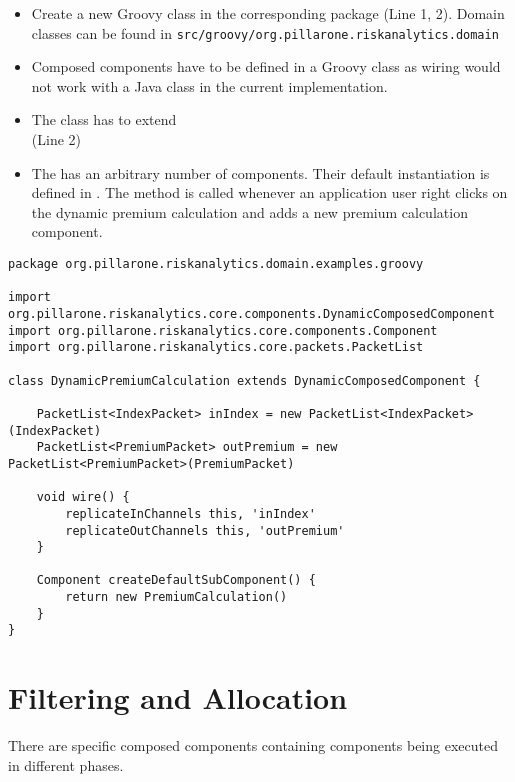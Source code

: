 \begin{itemize}
  \item Create a new Groovy class in the corresponding package (Line 1, 2). Domain classes can be found in \texttt{src/groovy/org.pillarone.riskanalytics.domain}
  \item Composed components have to be defined in a Groovy class as wiring would not work with a Java class in the current implementation.
  \item The class has to extend
    \\  (Line 2)
  \item The  has an arbitrary number of  components. Their default instantiation is defined in . The method is called whenever an application user right clicks on the dynamic premium calculation and adds a new premium calculation component.
\end{itemize}
\begin{lstlisting}[label=lst:dcompcomp]
package org.pillarone.riskanalytics.domain.examples.groovy

import org.pillarone.riskanalytics.core.components.DynamicComposedComponent
import org.pillarone.riskanalytics.core.components.Component
import org.pillarone.riskanalytics.core.packets.PacketList

class DynamicPremiumCalculation extends DynamicComposedComponent {
    
    PacketList<IndexPacket> inIndex = new PacketList<IndexPacket>(IndexPacket)
    PacketList<PremiumPacket> outPremium = new PacketList<PremiumPacket>(PremiumPacket)
    
    void wire() {
        replicateInChannels this, 'inIndex'
        replicateOutChannels this, 'outPremium'
    }

    Component createDefaultSubComponent() {
        return new PremiumCalculation()
    }
}
\end{lstlisting}

\section{Filtering and Allocation}
\label{par:filteralloc}

There are specific composed components containing components being executed in different phases.

